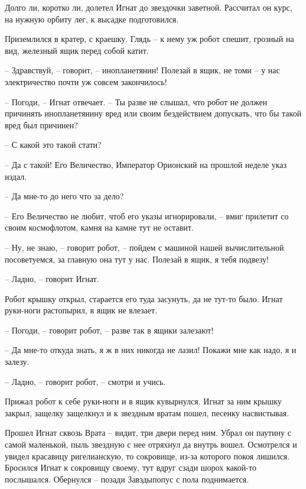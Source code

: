 \documentclass[ebook,oneside,final,openright]{memoir}
\begin{document}
\par
Долго ли, коротко ли, долетел Игнат до звездочки заветной. Рассчитал он курс, на нужную орбиту лег, к высадке подготовился.\par
\par
Приземлился в кратер, с краешку. Глядь – к нему уж робот спешит, грозный на вид, железный ящик перед собой катит.\par
– Здравствуй, – говорит, – инопланетянин! Полезай в ящик, не томи – у нас электричество почти уж совсем закончилось!\par
– Погоди, – Игнат отвечает. – Ты разве не слышал, что робот не должен причинять инопланетянину вред или своим бездействием допускать, что бы такой вред был причинен?\par
– С какой это такой стати?\par
– Да с такой! Его Величество, Император Орионский на прошлой неделе указ издал.\par
– Да мне-то до него что за дело?\par
– Его Величество не любит, чтоб его указы игнорировали, – вмиг прилетит со своим космофлотом, камня на камне тут не оставит.\par
– Ну, не знаю, – говорит робот, – пойдем с машиной нашей вычислительной посоветуемся, за главную она тут у нас. Полезай в ящик, я тебя подвезу!\par
– Ладно, – говорит Игнат.\par
Робот крышку открыл, старается его туда засунуть, да не тут-то было. Игнат руки-ноги растопырил, в ящик не влезает. \par
– Погоди, – говорит робот, – разве так в ящики залезают! \par
– Да мне-то откуда знать, я ж в них никогда не лазил! Покажи мне как надо, я и залезу. \par
– Ладно, – говорит робот, – смотри и учись. \par
Прижал робот к себе руки-ноги и в ящик кувырнулся. Игнат за ним крышку закрыл, защелку защелкнул и к звездным вратам пошел, песенку насвистывая.\par
\par
Прошел Игнат сквозь Врата – видит, три двери перед ним. Убрал он паутину с самой маленькой, пыль звездную с нее отряхнул да внутрь вошел. Осмотрелся и увидел красавицу ригелианскую, то сокровище, из-за которого покоя лишился. Бросился Игнат к сокровищу своему, тут вдруг сзади шорох какой-то послышался. Обернулся – позади Завздыпопус с пола поднимается.\par
\end{document}
